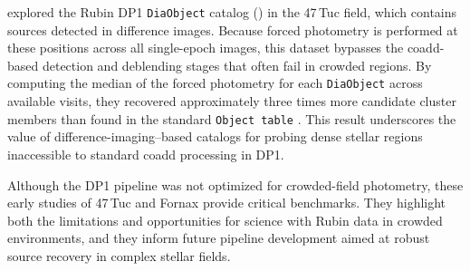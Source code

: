 \citet{2025RNAAS...9..171W} explored the Rubin DP1 \texttt{DiaObject} catalog () in the 47\,Tuc field, which contains sources detected in difference images. 
Because forced photometry is performed at these positions across all single-epoch images, this dataset bypasses the coadd-based detection and deblending stages that often fail in crowded regions. 
By computing the median of the forced photometry for each  \texttt{DiaObject} across available visits, they recovered approximately three times more candidate cluster members than found in the standard \texttt{Object table} \citep{2025arXiv250701343C}. 
This result underscores the value of difference-imaging–based catalogs for probing dense stellar regions inaccessible to standard coadd processing in DP1.

Although the DP1 pipeline was not optimized for crowded-field photometry, these early studies of 47\,Tuc and Fornax provide critical benchmarks. 
They highlight both the limitations and opportunities for science with Rubin data in crowded environments, and they inform future pipeline development aimed at robust source recovery in complex stellar fields.
